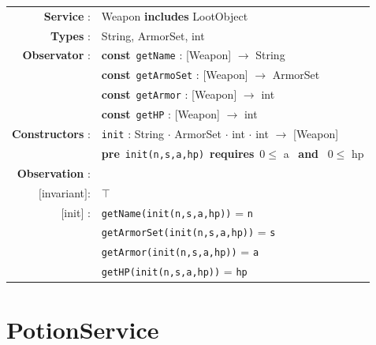 \documentclass[12pt]{report}
\begin{document}
\begin{tabular}{rl}
    \textbf{Service} : & Weapon \textbf{includes} LootObject \\

    \textbf{Types} : & \textrm{String}, \textrm{ArmorSet}, \textrm{int} \\

    \textbf{Observator} : & \textbf{const}~\texttt{getName} : \textrm{[Weapon]} $\rightarrow$ \textrm{String} \\
    & \textbf{const}~\texttt{getArmoSet} : \textrm{[Weapon]} $\rightarrow$ \textrm{ArmorSet} \\
    & \textbf{const}~\texttt{getArmor} : \textrm{[Weapon]} $\rightarrow$ \textrm{int} \\
    & \textbf{const}~\texttt{getHP} : \textrm{[Weapon]} $\rightarrow$ \textrm{int} \\

    \textbf{Constructors} : & \texttt{init} : \textrm{String} $\cdot$ \textrm{ArmorSet} $\cdot$ \textrm{int} $\cdot$ \textrm{int} $\rightarrow$ \textrm{[Weapon]} \\
    & \quad\quad \textbf{pre}~\texttt{init(n,s,a,hp)}~\textbf{requires}~$0 \leq$ a ~\textbf{and}~ $0 \leq$ hp  \\

    \textbf{Observation} : \\
    $[$invariant$]$: & $\top$ \\
    $[$init$]$ : & \texttt{getName(init(n,s,a,hp))} = \texttt{n} \\
    & \texttt{getArmorSet(init(n,s,a,hp))} = \texttt{s} \\
    & \texttt{getArmor(init(n,s,a,hp))} = \texttt{a} \\
    & \texttt{getHP(init(n,s,a,hp))} = \texttt{hp} \\

\end{tabular}

\section{PotionService}
\end{document}
